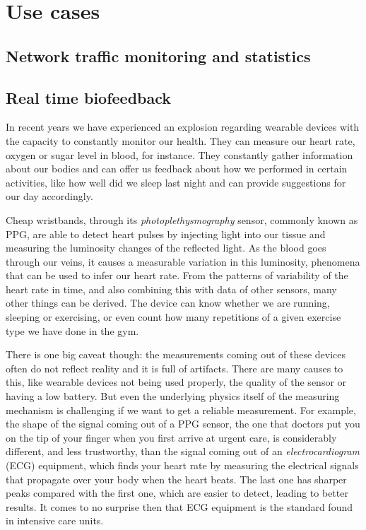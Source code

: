 \documentclass[preprint,1p,times]{elsarticle}
\begin{document}
\section{Use cases}
\subsection{Network traffic monitoring and statistics}
\subsection{Real time biofeedback}

In recent years we have experienced an explosion regarding wearable devices with the capacity to
constantly monitor our health. They can measure our heart rate, oxygen or sugar level in blood,
for instance. They constantly gather information about our bodies and can offer us feedback about
how we performed in certain activities, like how well did we sleep last night and can provide 
suggestions for our day accordingly.

Cheap wristbands, through its \textit{photoplethysmography} sensor, commonly known as PPG, are able to detect
heart pulses by injecting light into our tissue and measuring the luminosity changes of the reflected 
light. As the blood goes through our veins, it causes a measurable variation in this luminosity,
phenomena that can be used to infer our heart rate. From the patterns of variability of the heart 
rate in time, and also combining this with data of other sensors, many other things can be derived. 
The device can know whether we are running, sleeping or exercising, or even count how many repetitions 
of a given exercise type we have done in the gym.

There is one big caveat though: the measurements coming out of these devices often do not reflect reality 
and it is full of artifacts. There are many causes to this, like wearable devices not being used properly,
the quality of the sensor or having a low battery. But even the underlying physics itself of the measuring
mechanism is challenging if we want to get a reliable measurement. For example, the shape of the signal
coming out of a PPG sensor, the one that doctors put you on the tip of your finger when you first arrive
at urgent care, is considerably different, and less trustworthy,  than the signal coming out of an 
\textit{electrocardiogram} (ECG) equipment, which finds your heart rate by measuring the electrical signals that 
propagate over your body when the heart beats. The last one has sharper peaks compared with the first one, 
which are easier to detect, leading to better results. It comes to no surprise then that ECG equipment is 
the standard found in intensive care units.
\end{document}

